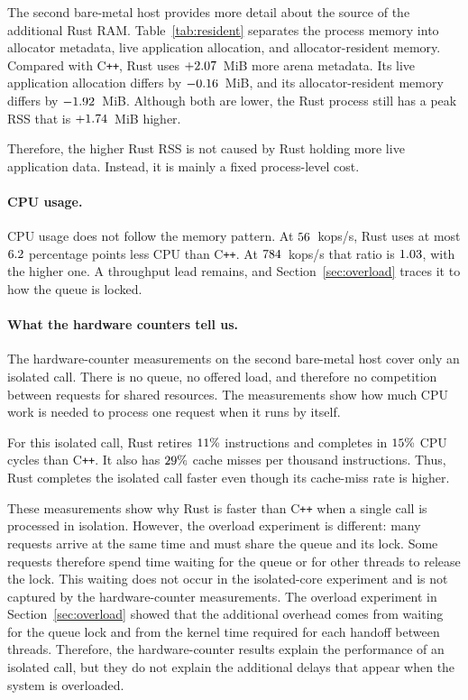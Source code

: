 \documentclass[english,oneside,a4paper,censored,csm,software-track-2020]{HYthesisML}
\begin{document}
\FloatBarrier
The second bare-metal host provides more detail about the source of the
additional Rust RAM. Table~\ref{tab:resident} separates the process memory
into allocator metadata, live application allocation, and
allocator-resident memory. Compared with C\texttt{++}, Rust uses
$+2.07$~MiB more arena metadata. Its live application allocation
differs by $-0.16$~MiB, and its allocator-resident memory differs
by $-1.92$~MiB. Although both are lower, the Rust process still
has a peak RSS that is $+1.74$~MiB higher.

Therefore, the higher Rust RSS is not caused by Rust holding more live
application data. Instead, it is mainly a fixed process-level cost.

\paragraph{CPU usage.}
CPU usage does not follow the memory pattern. At $56$~kops/s, Rust
uses at most $6.2$ percentage points less CPU than
C\texttt{++}. At $784$~kops/s that ratio is
$1.03$, with \ProbeAfterCpuPerOpHigher{} the higher
one. A throughput lead remains, and Section~\ref{sec:overload} traces it
to how the queue is locked.

\paragraph{What the hardware counters tell us.}

The hardware-counter measurements on the second bare-metal host cover only
an isolated call. There is no queue, no offered load, and therefore no
competition between requests for shared resources. The measurements show
how much CPU work is needed to process one request when it runs by itself.

For this isolated call, Rust retires $11\%$ \BmInstrDeltaDir{}
instructions and completes in $15\%$ \BmCycleDeltaDir{} CPU cycles
than C\texttt{++}. It also has $29\%$ \BmMissDeltaDir{} cache misses
per thousand instructions. Thus, Rust completes the isolated call
faster even though its cache-miss rate is higher.

These measurements show why Rust is faster than C\texttt{++} when a single
call is processed in isolation. However, the overload experiment is
different: many requests arrive at the same time and must share the queue
and its lock. Some requests therefore spend time waiting for the queue or
for other threads to release the lock. This waiting does not occur in the
isolated-core experiment and is not captured by the hardware-counter
measurements. The overload experiment in Section~\ref{sec:overload} showed that 
the additional overhead comes from waiting for the queue lock and from 
the kernel time required for each handoff between threads. 
Therefore, the hardware-counter results explain the performance of 
an isolated call, but they do not explain the additional delays 
that appear when the system is overloaded.
\end{document}
